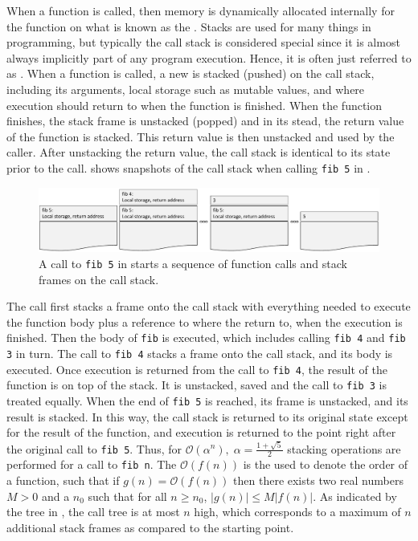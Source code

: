 \documentclass[fsharpNotes.tex]{subfiles}
\begin{document}
When a function is called, then memory is dynamically allocated internally for the function on what is known as the . Stacks are used for many things in programming, but typically the call stack is considered special since it is almost always implicitly part of any program execution. Hence, it is often just referred to as . When a function is called, a new  is stacked (pushed) on the call stack, including its arguments, local storage such as mutable values, and where execution should return to when the function is finished. When the function finishes, the stack frame is unstacked (popped) and in its stead, the return value of the function is stacked. This return value is then unstacked and used by the caller. After unstacking the return value, the call stack is identical to its state prior to the call.  shows snapshots of the call stack when calling \lstinline{fib 5} in . 
\begin{figure}
  \centering
  \includegraphics[width=\textwidth]{TheCallStack}
  \caption{A call to \lstinline{fib 5} in  starts a sequence of function calls and stack frames on the call stack.}
  \label{fig:TheStack}
\end{figure}
The call first stacks a frame onto the call stack with everything needed to execute the function body plus a reference to where the return to, when the execution is finished. Then the body of \lstinline{fib} is executed, which includes calling \lstinline{fib 4} and \lstinline{fib 3} in turn. The call to \lstinline{fib 4} stacks a frame onto the call stack, and its body is executed. Once execution is returned from the call to \lstinline{fib 4}, the result of the function is on top of the stack. It is unstacked, saved and the call to \lstinline{fib 3} is treated equally. When the end of \lstinline{fib 5} is reached, its frame is unstacked, and its result is stacked. In this way, the call stack is returned to its original state except for the result of the function, and execution is returned to the point right after the original call to \lstinline{fib 5}. Thus, for  $\mathcal{O}\left(\alpha^n\right),\; \alpha=\frac{1+\sqrt{5}}{2}$ stacking operations are performed for a call to \lstinline{fib n}. The $\mathcal{O}\left(f(n)\right)$ is the  used to denote the order of a function, such that if $g(n) = \mathcal{O}(f(n))$ then there exists two real numbers $M>0$ and a $n_0$ such that for all $n\geq n_0$, $|g(n)| \leq M |f(n)|$. As indicated by the tree in , the call tree is at most $n$ high, which corresponds to a maximum of $n$ additional stack frames as compared to the starting point.
\end{document}
